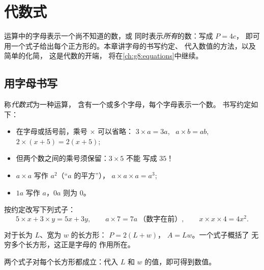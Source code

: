 \chapter{代数式}\label{ch:g7:literal}

运算中的字母表示一个尚不知道的数，或
同时表示\emph{所有}的数：写成 $P = 4c$，
即可用一个式子给出每个正方形的。本章讲字母的书写约定、
代入数值的方法，以及简单的化简，
这是代数的开端，
将在\cref{ch:g8:equations}中继续。

\section{用字母书写}

\begin{definition}[代数式]\label{def:g7:literal:def}
称\emph{代数式}为一种运算，
含有一个或多个字母，每个字母表示一个数。
书写约定如下：
\begin{itemize}
  \item 在字母或括号前，乘号 $\times$ 可以省略：
        $3 \times a = 3a$, \ $a \times b = ab$, \
        $2 \times (x + 5) = 2(x + 5)$;
  \item 但两个数之间的乘号须保留：$3 \times 5$ 不能
        写成 $35$！
  \item $a \times a$ 写作 $a^2$（“$a$ 的平方”），
        $a \times a \times a = a^3$;
  \item $1a$ 写作 $a$，$0a$ 则为 $0$。
\end{itemize}
\end{definition}

\begin{example}\label{ex:g7:literal:write}
按约定改写下列式子：
\[
5 \times x + 3 \times y = 5x + 3y,
\qquad
a \times 7 = 7a \ \text{（数字在前）},
\qquad
x \times x \times 4 = 4x^2 .
\]
\end{example}

\begin{example}[公式也是代数式]\label{ex:g7:literal:formulas}
对于长为 $L$、宽为 $w$ 的长方形：
 $P = 2(L + w)$， $A = Lw$。一个式子概括了
无穷多个长方形，这正是字母的
作用所在。
\end{example}

\begin{omfigure}

{\small 两个式子对每个长方形都成立：代入
$L$ 和 $w$ 的值，即可得到数值。}
\end{omfigure}

